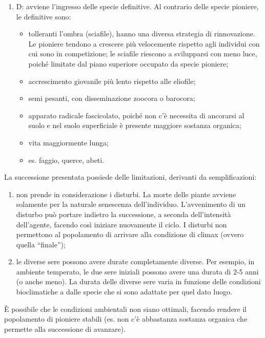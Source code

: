 \begin{enumerate}[nosep]
\item D: avviene l'ingresso delle specie definitive. Al contrario delle specie pioniere, le definitive sono:
    \begin{itemize}[nosep]
        \item tolleranti l'ombra (sciafile), hanno una diversa strategia di rinnovazione. Le pioniere tendono a crescere più velocemente rispetto agli individui con cui sono in competizione; le sciafile riescono a svilupparsi con meno luce, poiché limitate dal piano superiore occupato da specie pioniere;
        \item accrescimento giovanile più lento rispetto alle eliofile;
        \item semi pesanti, con disseminazione zoocora o barocora;
        \item apparato radicale fascicolato, poiché non c'è necessita di ancorarsi al suolo e nel suolo superficiale è presente maggiore sostanza organica;
        \item vita maggiormente lunga;
        \item es. faggio, querce, abeti.
    \end{itemize}
\end{enumerate}
La successione presentata possiede delle limitazioni, derivanti da semplificazioni:
\begin{enumerate}[nosep]
    \item non prende in considerazione i disturbi. La morte delle piante avviene solamente per la naturale senescenza dell'individuo. L'avvenimento di un disturbo può portare indietro la successione, a seconda dell'intensità dell'agente, facendo così iniziare nuovamente il ciclo. I disturbi non permettono al popolamento di arrivare alla condizione di climax (ovvero quella ``finale'');
    \item le diverse sere possono avere durate completamente diverse. Per esempio, in ambiente temperato, le due sere iniziali possono avere una durata di 2-5 anni (o anche meno). La durata delle diverse sere varia in funzione delle condizioni bioclimatiche a dalle specie che si sono adattate per quel dato luogo.
\end{enumerate}
È possibile che le condizioni ambientali non siano ottimali, facendo rendere il popolamento di pioniere stabili (es. non c'è abbastanza sostanza organica che permette alla successione di avanzare).
